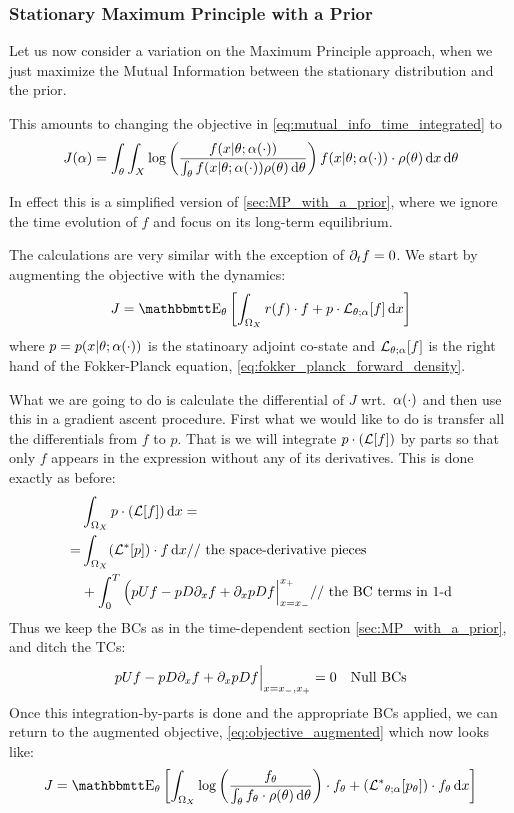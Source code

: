 \subsubsection{Stationary Maximum Principle with a Prior}
\label{sec:StatMP_with_a_prior}
Let us now consider a variation on the Maximum Principle approach, when we just
maximize the Mutual Information between the stationary distribution and the
prior.

This amounts to changing the objective in
\cref{eq:mutual_info_time_integrated} to  
$$
J(\alpha)  = \int_{ \theta} \int_X
 \log\left(\frac{f(x|{ \theta} ; \alpha(\cdot) )}
 			{\int_{ \theta} f(x|{ \theta}; \alpha(\cdot)) \rho({ \theta})\, \mathrm{d} { \theta}}\right) 
 f(x|{ \theta}; \alpha(\cdot)) \cdot \rho({ \theta}) \, \mathrm{d} x\, \mathrm{d} { \theta}
$$

In effect this is a simplified version of \cref{sec:MP_with_a_prior}, where we
ignore the time evolution of $f$ and focus on its long-term equilibrium.

The calculations are very similar with the exception of ${\partial}_t f = 0$. We start
by augmenting the objective with the dynamics:
\begin{equation}
J =  \Exp_\th
\left[ \int_{\O_X} r(f) \cdot f + p \cdot \L_{\th;\a}[f]
\intd{x}\right] 
\label{eq:objective_stat_augmented}
\end{equation} 
where $p =  p(x|{ \theta}; \alpha(\cdot))$ is the statinoary adjoint co-state and 
${ \mathcal{L} }_{{ \theta};\alpha}[f]$ is the right hand of the Fokker-Planck equation,
\cref{eq:fokker_planck_forward_density}.

What we are going to do is calculate the differential of $J$ wrt.\ $\alpha(\cdot)$
and then use this in a gradient ascent procedure. First what we would like to do
is transfer all the differentials from $f$ to $p$. That is we will integrate $p
\cdot ({ \mathcal{L} }[f])$ by parts so that only $f$ appears in the expression
without any of its derivatives. This is done exactly as before:
\begin{align*}
& \int_{{\Omega}_X} p \cdot ({ \mathcal{L} }[f]) \, \mathrm{d} x=
\\
=& \int_{{\Omega}_X}
	    ({ { \mathcal{L} }^* }[p])\cdot f 
	 \, \mathrm{d} x  \textrm{// the space-derivative pieces }
	  \\
	  &+ \int_0^T 
	   \Big( p U f - p D {\partial}_xf + {\partial}_x p D f \Big|_{x={ x_{-} }}^{{ x_{+} }} 
	   \textrm{// the BC terms in 1-d}
\end{align*}
Thus we keep the BCs as in the time-dependent section
\cref{sec:MP_with_a_prior}, and ditch the TCs:
\begin{align*}
p U f - p D {\partial}_xf + {\partial}_x p D f &\Big|_{x={ x_{-} }, { x_{+} }} = 0 & \textrm{Null BCs}
\end{align*}
Once this integration-by-parts is done and the appropriate BCs applied, we
can return to the augmented objective, \cref{eq:objective_augmented} which now
looks like:
\begin{equation}
J =  \Exp_\th
\left[ \int_{\O_X} \log\left(\frac{f_\th}
 					{\int_\th f_\th \cdot \rho(\th)\intd{\th}}\right) 
 			 \cdot f_\th 
 			 + 
 			 (\Lstar_{\th;\a}[p_\th] ) \cdot f_\th
\intd{x}
\right]
\label{eq:objective_stat_augmented_adjoined}
\end{equation}


